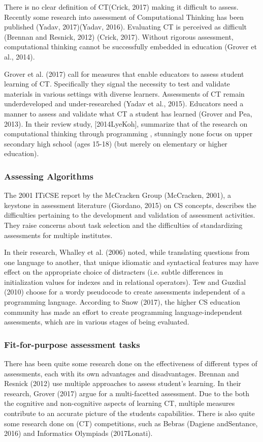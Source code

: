 There is no clear definition of CT(Crick, 2017) making it difficult to assess. Recently some research into assessment of Computational Thinking has been published (Yadav, 2017)(Yadav, 2016). Evaluating CT is perceived as difficult (Brennan and Resnick, 2012) (Crick, 2017).
Without rigorous assessment, computational thinking cannot be successfully embedded in education (Grover et al., 2014).

Grover et al. (2017) call for measures that enable educators to assess student learning of CT.  Specifically they signal the necessity to test and validate materials in various settings with diverse learners.
Assessments of CT remain underdeveloped and under-researched (Yadav et al., 2015).
Educators need a manner to assess and validate what CT a student has learned (Grover and Pea, 2013).
In their review study, [2014LyeKoh], summarize that of the research on computational thinking through programming , stunningly none focus on upper secondary high school (ages 15-18) (but merely on elementary or higher education).


\subsubsection*{Assessing Algorithms}

The 2001 ITiCSE report by the McCracken Group (McCracken, 2001), a keystone in assessment literature (Giordano, 2015) on CS concepts, describes the difficulties pertaining to the development and validation of assessment activities. They raise concerns about task selection and the difficulties of standardizing assessments for multiple institutes.

In their research, Whalley et al. (2006) noted, while translating questions from one language to another, that unique idiomatic and syntactical features may have effect on the appropriate choice of distracters (i.e. subtle differences in initialization values for indexes and in relational operators). Tew and Guzdial (2010) choose for a wordy pseudocode to create assessments independent of a programming language. According to Snow (2017), the higher CS education community has made an effort to create programming language-independent assessments, which are in various stages of being evaluated.


\subsubsection*{Fit-for-purpose assessment tasks}
There has been quite some research done on the effectiveness of different types of assessments, each with its own advantages and disadvantages. Brennan and Resnick (2012) use multiple approaches to assess student's learning. In their research, Grover (2017) argue for a multi-facetted assessment. Due to the both the cognitive and non-cognitive aspects of learning CT, multiple measures contribute to an accurate picture of the students capabilities. There is also quite some research done on (CT) competitions, such as Bebras (Dagiene andSentance, 2016) and Informatics Olympiads (2017Lonati).



